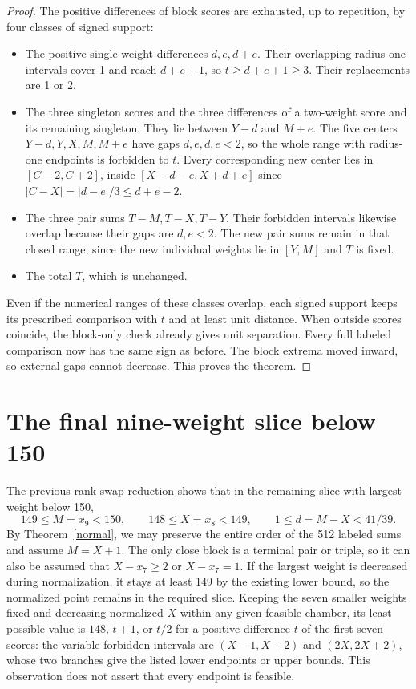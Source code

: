 \documentclass[10pt,letterpaper]{article}
\begin{document}
\begin{proof}
The positive differences of block scores are exhausted, up to
repetition, by four classes of signed support:
\begin{itemize}
\item The positive single-weight differences \(d,e,d+e\).
Their overlapping radius-one intervals cover 1 and reach
\(d+e+1\), so \(t\ge d+e+1\ge3\). Their replacements are 1 or 2.
\item The three singleton scores and the three differences of
a two-weight score and its remaining singleton. They lie
between \(Y-d\) and \(M+e\). The five centers
\(Y-d,Y,X,M,M+e\) have gaps \(d,e,d,e<2\), so the whole
range with radius-one endpoints is forbidden to \(t\).
Every corresponding new center lies in \([C-2,C+2]\),
inside \([X-d-e,X+d+e]\) since
\(|C-X|=|d-e|/3\le d+e-2\).
\item The three pair sums \(T-M,T-X,T-Y\).
Their forbidden intervals likewise overlap because their gaps
are \(d,e<2\). The new pair sums remain in that closed
range, since the new individual weights lie in \([Y,M]\)
and \(T\) is fixed.
\item The total \(T\), which is unchanged.
\end{itemize}
Even if the numerical ranges of these classes overlap, each
signed support keeps its prescribed comparison with \(t\)
and at least unit distance. When outside scores coincide,
the block-only check already gives unit separation.
Every full labeled comparison now has the same sign as before.
The block extrema moved inward, so external gaps cannot
decrease. This proves the theorem.
\end{proof}

\section*{The final nine-weight slice below 150}
The
\href{https://github.com/Aafimalek/novel-discoveries/tree/c582f2587588eeeb195048a74552fe80bdc1d0e7/nine-separated-subset-sums/verification/rank-cuts-below-150/only-floor-148}{previous rank-swap reduction}
shows that in the remaining slice with largest weight below 150,
\[
 149\le M=x_9<150,\qquad 148\le X=x_8<149,\qquad
 1\le d=M-X<41/39.
\]
By Theorem~\ref{normal}, we may preserve the entire order of
the 512 labeled sums and assume \(M=X+1\). The only close block
is a terminal pair or triple, so it can also be assumed that
\(X-x_7\ge2\) or \(X-x_7=1\). If the largest weight is
decreased during normalization, it stays at least 149 by
the existing lower bound, so the normalized point remains
in the required slice. Keeping the seven smaller weights fixed
and decreasing normalized \(X\) within any given feasible
chamber, its least possible value is \(148\), \(t+1\), or
\(t/2\) for a positive difference \(t\) of the first-seven scores:
the variable forbidden intervals are \((X-1,X+2)\)
and \((2X,2X+2)\), whose two branches give the listed lower
endpoints or upper bounds. This observation does not assert
that every endpoint is feasible.
\end{document}
